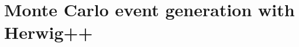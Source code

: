 \documentclass[twoside,english]{uiofysmaster}
\begin{document}



\section{Monte Carlo event generation with {\ttfamily Herwig++}}
\end{document}
